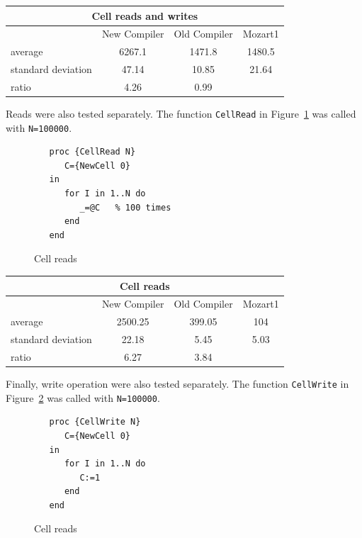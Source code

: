 \documentclass[a4paper]{memoir}
\begin{document}
\begin{appendices}
\begin{center}
\begin{tabular} {| l c c c|}
\hline
\multicolumn{4}{|c|}{\textbf{Cell reads and writes}} \\ \hline
  & New Compiler& Old Compiler & Mozart1 \\
average&6267.1&1471.8&1480.5 \\
standard deviation&47.14&10.85&21.64 \\
ratio&4.26& 0.99  & \\
\hline
\end{tabular}
\end{center}



Reads were also tested separately. The function \lstinline!CellRead! in Figure~\ref{fig:perfs:cellread} was called
with \lstinline!N=100000!.

\begin{figure}[h]
\begin{lstlisting}
   proc {CellRead N}
      C={NewCell 0}
   in
      for I in 1..N do
         _=@C   % 100 times
      end
   end
\end{lstlisting}
\caption{Cell reads}
\label{fig:perfs:cellread}
\end{figure}


\begin{center}
\begin{tabular} {| l c c c|}
\hline
\multicolumn{4}{|c|}{\textbf{Cell reads}} \\ \hline
  & New Compiler& Old Compiler & Mozart1 \\
average&2500.25&399.05& 104 \\
standard deviation&22.18&5.45& 5.03 \\
ratio&6.27& 3.84  & \\

\hline
\end{tabular}
\end{center}



Finally, write operation were also tested separately. The function
\lstinline!CellWrite! in Figure~\ref{fig:perfs:cellreads} was called with \lstinline!N=100000!.

\begin{figure}[h]
\begin{lstlisting}
   proc {CellWrite N}
      C={NewCell 0}
   in
      for I in 1..N do
         C:=1
      end
   end
\end{lstlisting}
\caption{Cell reads}
\label{fig:perfs:cellreads}
\end{figure}



\end{appendices}
\end{document}
